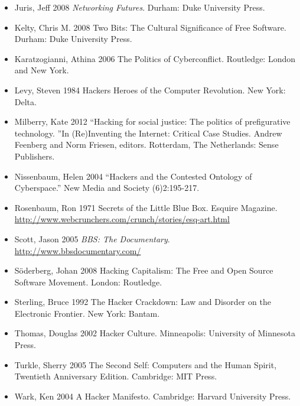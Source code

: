 \documentclass[letterpaper,12pt,english]{sphinxmanual}
\begin{document}
\begin{itemize}
\item {} 
Juris, Jeff 2008 \emph{Networking Futures}. Durham: Duke University Press.

\item {} 
Kelty, Chris M. 2008 Two Bits: The Cultural Significance of Free Software. Durham: Duke University Press.

\item {} 
Karatzogianni, Athina 2006 The Politics of Cyberconflict. Routledge: London and New York.

\item {} 
Levy, Steven 1984 Hackers Heroes of the Computer Revolution. New York: Delta.

\item {} 
Milberry, Kate 2012 “Hacking for social justice: The politics of prefigurative technology. ”In (Re)Inventing the Internet: Critical Case Studies. Andrew Feenberg and Norm Friesen, editors. Rotterdam, The Netherlands: Sense Publishers.

\item {} 
Nissenbaum, Helen 2004 “Hackers and the Contested Ontology of Cyberspace.” New Media and Society (6)2:195-217.

\item {} 
Rosenbaum, Ron 1971 Secrets of the Little Blue Box. Esquire Magazine. \url{http://www.webcrunchers.com/crunch/stories/esq-art.html}

\item {} 
Scott, Jason 2005 \emph{BBS: The Documentary}. \url{http://www.bbsdocumentary.com/}

\item {} 
Söderberg, Johan 2008 Hacking Capitalism: The Free and Open Source Software Movement. London: Routledge.

\item {} 
Sterling, Bruce 1992 The Hacker Crackdown: Law and Disorder on the Electronic Frontier. New York: Bantam.

\item {} 
Thomas, Douglas 2002 Hacker Culture. Minneapolis: University of Minnesota Press.

\item {} 
Turkle, Sherry 2005 The Second Self: Computers and the Human Spirit, Twentieth Anniversary Edition. Cambridge: MIT Press.

\item {} 
Wark, Ken 2004 A Hacker Manifesto. Cambridge: Harvard University Press.

\end{itemize}
\end{document}
